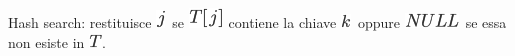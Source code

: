 \documentclass{article}
\begin{document}
{}

{}

{Hash search: restituisce }\includegraphics{images/image239.png}{~se
}\includegraphics{images/image244.png}{~contiene la chiave
}\includegraphics{images/image118.png}{~oppure
}\includegraphics{images/image240.png}{~se essa non esiste in
}\includegraphics{images/image37.png}{.}

{}

\protect\hypertarget{t.9facc68cfa90288f5906042d8bc73266aeff5bdd}{}{}\protect\hypertarget{t.36}{}{}
\end{document}
